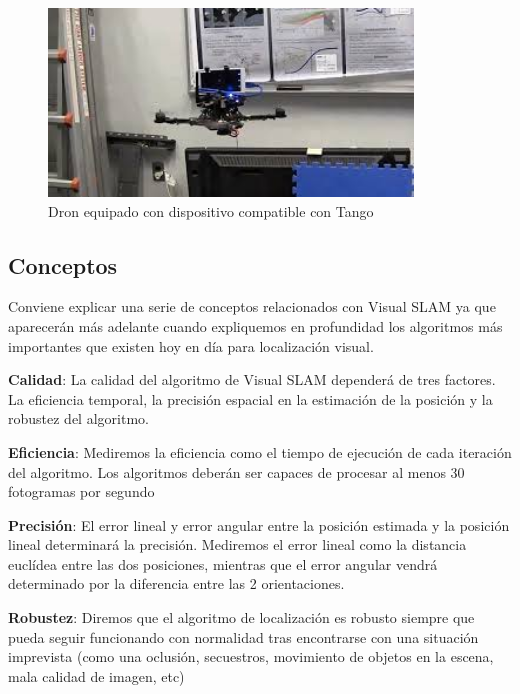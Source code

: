 \begin {enumerate}
\begin{figure}[H]
\begin{center}
\includegraphics[height=5.0cm]{img/cap2/droneTango.jpg}
\end{center}
\caption{Dron equipado con dispositivo compatible con Tango}
\end{figure}

\end {enumerate}



\subsection{Conceptos}

Conviene explicar una serie de conceptos relacionados con Visual SLAM ya que aparecerán más adelante cuando expliquemos en profundidad los algoritmos más importantes que existen hoy en día para localización visual.

\textbf{Calidad}: La calidad del algoritmo de Visual SLAM dependerá de tres factores. La eficiencia temporal, la precisión espacial en la estimación de la posición y la robustez del algoritmo.

\textbf{Eficiencia}: Mediremos la eficiencia como el tiempo de ejecución de cada iteración del algoritmo. Los algoritmos deberán ser capaces de procesar al menos 30 fotogramas por segundo

\textbf{Precisión}:  El error lineal y error angular entre la posición estimada y la posición lineal determinará la precisión. Mediremos el error lineal como la distancia euclídea entre las dos posiciones, mientras que el error angular vendrá determinado por la diferencia entre las 2 orientaciones.

\textbf{Robustez}: Diremos que el algoritmo de localización es robusto siempre que pueda seguir funcionando con normalidad tras encontrarse con una situación imprevista (como una oclusión, secuestros, movimiento de objetos en la escena, mala calidad de imagen, etc)

